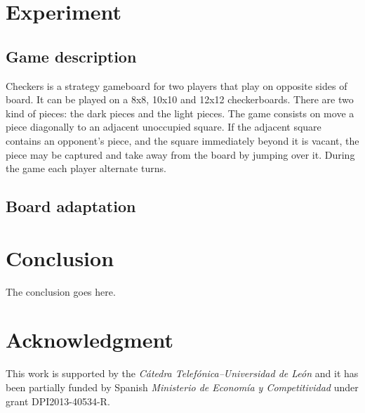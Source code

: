 \documentclass[journal,twoside]{JoPhA}
\begin{document}
\section{Experiment}
\label{sec:experiment}

\subsection{Game description}

Checkers is a strategy gameboard for two players that play on opposite sides of board. It can be played on a 8x8, 10x10 and 12x12 checkerboards.
There are two kind of pieces: the dark pieces and the light pieces. 
The game consists on move a piece diagonally to an adjacent unoccupied square. If the adjacent square contains an opponent's piece, and the square immediately beyond it is vacant, the piece may be captured and take away from the board by jumping over it. During the game each player alternate turns.

\subsection{Board adaptation}


\section{Conclusion}

The conclusion goes here.


\section*{Acknowledgment}

This work is supported by the \textit{C\'{a}tedra Telef\'{o}nica--Universidad de Le\'{o}n} and it has been partially funded by Spanish \textit{Ministerio de Econom\'{i}a y Competitividad} under grant DPI2013-40534-R.
\end{document}
